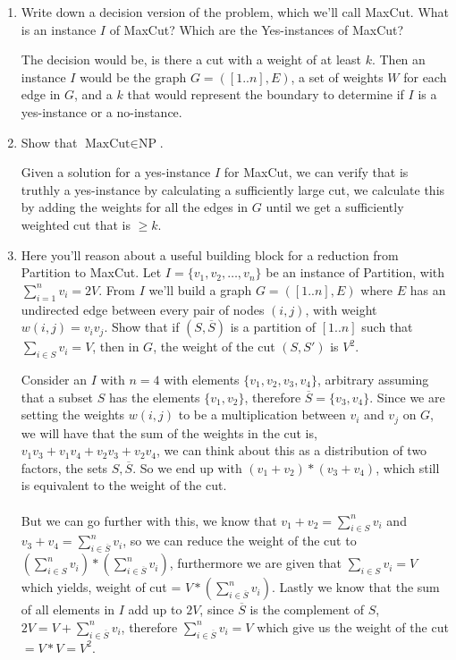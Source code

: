\documentclass[11pt]{article}
\def\question#1{\red{#1}}
\def\soln#1{\par\blu{#1}} %
\def\blu#1{{\color{blu}#1}}
\def\red#1{{\color{red}#1}}
\begin{document}
\begin{enumerate}
\item \question{Write down a decision version of the problem, which
we'll call MaxCut. What is an instance $I$ of MaxCut? Which are the
Yes-instances of MaxCut?}
\soln{
   The decision would be, is there a cut with a weight of at least $k$. Then an instance $I$ 
   would be the graph $G=([1..n],E)$, a set of weights $W$ for each edge in $G$, and a $k$ 
   that would represent the boundary to determine if $I$ is a yes-instance or a no-instance.
}

\item \question{Show that $\text{MaxCut} \in \text{NP}$.}
\soln{
   Given a solution for a yes-instance $I$ for MaxCut, we can verify that is truthly a yes-instance 
   by calculating a sufficiently large cut, we calculate this by adding the weights for all the edges 
   in $G$ until we get a sufficiently weighted cut that is $\geq k$.
}

\item Here you'll reason about a useful building block for a reduction
from Partition to MaxCut.
Let $I = \{v_1,v_2,\ldots,v_n\}$ be an instance of Partition, with
$\sum_{i=1}^n v_i = 2V$.  From $I$ we'll build a graph $G =
   ([1..n], E)$ where $E$ has an undirected edge between every pair of
nodes $(i,j)$, with weight $w(i,j) = v_i v_j$.
\question{Show that if $(S, \overline{S})$ is a partition of $[1..n]$ such that
$\sum_{i\in S} v_i = V$, then in $G$, the weight of the cut $(S,S')$
is $V^2$.}
\soln{
   Consider an $I$ with $n=4$ with elements $\{v_1, v_2, v_3, v_4 \}$, arbitrary assuming that a subset $S$ has 
   the elements $\{ v_1, v_2 \}$, therefore $\overline{S} = \{ v_3, v_4\}$. Since we are setting the 
   weights $w(i,j)$ to be a multiplication between $v_i$ and $v_j$ on $G$, we will have that the sum of 
   the weights in the cut is, $v_1v_3 + v_1v_4 + v_2v_3 + v_2v_4$, we can think about this as a 
   distribution of two factors, the sets $S, \overline{S}$. So we end up with $(v_1+v_2) * (v_3+v_4)$, which 
   still is equivalent to the weight of the cut. \\ \\
   But we can go further with this, we know that $v_1+v_2 = \sum_{i \in S}^n v_i$ and
   $v_3+v_4 = \sum_{i \in \overline{S}}^n v_i$, so we can reduce the weight of the cut to 
   $(\sum_{i \in S}^n v_i) * (\sum_{i \in \overline{S}}^n v_i)$, furthermore we are given that 
   $\sum_{i\in S} v_i = V$ which yields, weight of cut = $V * (\sum_{i \in \overline{S}}^n v_i)$. Lastly 
   we know that the sum of all elements in $I$ add up to $2V$, since $\overline{S}$ is the complement 
   of $S$, $2V = V + \sum_{i \in \overline{S}}^n v_i$, therefore $ \sum_{i \in \overline{S}}^n v_i = V$
   which give us the weight of the cut $ = V*V = V^2$.
}


\end{enumerate}
\end{document}
